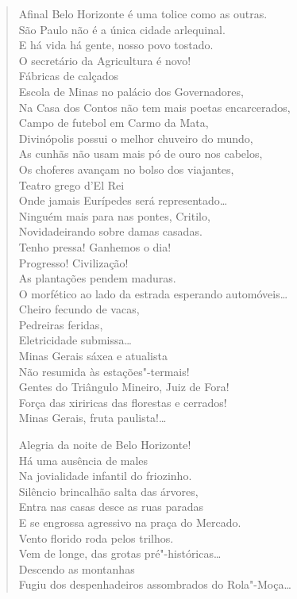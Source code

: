 \begin{verse}
Afinal Belo Horizonte é uma tolice como as outras.\\
São Paulo não é a única cidade arlequinal.\\
E há vida há gente, nosso povo tostado.\\
O secretário da Agricultura é novo!\\
Fábricas de calçados\\
Escola de Minas no palácio dos Governadores,\\
Na Casa dos Contos não tem mais poetas encarcerados,\\
Campo de futebol em Carmo da Mata,\\
Divinópolis possui o melhor chuveiro do mundo,\\
As cunhãs não usam mais pó de ouro nos cabelos,\\
Os choferes avançam no bolso dos viajantes,\\
Teatro grego d'El Rei\\
Onde jamais Eurípedes será representado\ldots{}\\
Ninguém mais para nas pontes, Critilo,\\
Novidadeirando sobre damas casadas.\\
Tenho pressa! Ganhemos o dia!\\
Progresso! Civilização!\\
As plantações pendem maduras.\\
\quad{}O morfético ao lado da estrada esperando automóveis\ldots{}\\
Cheiro fecundo de vacas,\\
Pedreiras feridas,\\
Eletricidade submissa\ldots{}\\
Minas Gerais sáxea e atualista\\
Não resumida às estações"-termais!\\
Gentes do Triângulo Mineiro, Juiz de Fora!\\
Força das xiriricas das florestas e cerrados!\\
Minas Gerais, fruta paulista!\ldots{}

Alegria da noite de Belo Horizonte!\\
Há uma ausência de males\\
Na jovialidade infantil do friozinho.\\
Silêncio brincalhão salta das árvores,\\
Entra nas casas desce as ruas paradas\\
E se engrossa agressivo na praça do Mercado.\\
Vento florido roda pelos trilhos.\\
Vem de longe, das grotas pré"-históricas\ldots{}\\
Descendo as montanhas\\
Fugiu dos despenhadeiros assombrados do Rola"-Moça\ldots{}


\end{verse}
